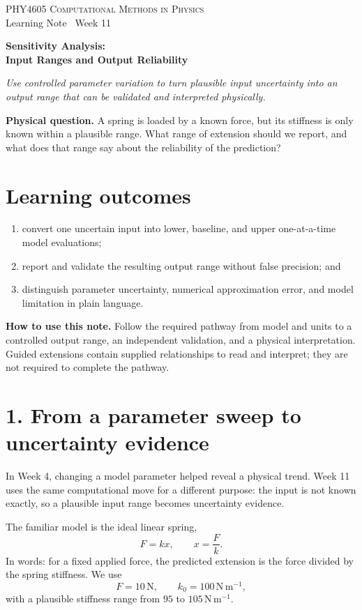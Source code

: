 \documentclass[11pt,a4paper]{article}
\newcommand{\course}{PHY4605 Computational Methods in Physics}
\newcommand{\units}[1]{\,\mathrm{#1}}
\begin{document}
{\large\textsc{\course}}\\[-2pt]
{\small Learning Note \textbar\ Week 11}\par\vspace{4pt}
{\LARGE\bfseries Sensitivity Analysis:\\[-1pt]
Input Ranges and Output Reliability}\par\vspace{3pt}
\textit{Use controlled parameter variation to turn plausible input uncertainty into an output range that can be validated and interpreted physically.}

\begin{keybox}\textbf{Physical question.} A spring is loaded by a known force, but its stiffness is only known within a plausible range. What range of extension should we report, and what does that range say about the reliability of the prediction?\end{keybox}

\section*{Learning outcomes}
\begin{enumerate}[nosep,leftmargin=5mm]
\item convert one uncertain input into lower, baseline, and upper one-at-a-time model evaluations;
\item report and validate the resulting output range without false precision; and
\item distinguish parameter uncertainty, numerical approximation error, and model limitation in plain language.
\end{enumerate}

\textbf{How to use this note.} Follow the required pathway from model and units to a controlled output range, an independent validation, and a physical interpretation. Guided extensions contain supplied relationships to read and interpret; they are not required to complete the pathway.

\section*{1. From a parameter sweep to uncertainty evidence}
In Week 4, changing a model parameter helped reveal a physical trend. Week 11 uses the same computational move for a different purpose: the input is not known exactly, so a plausible input range becomes uncertainty evidence.

The familiar model is the ideal linear spring,
\[
F=kx, \qquad x=\frac{F}{k}.
\]
In words: for a fixed applied force, the predicted extension is the force divided by the spring stiffness. We use
\[
F=10\units{N}, \qquad k_0=100\units{N\,m^{-1}},
\]
with a plausible stiffness range from $95$ to $105\units{N\,m^{-1}}$.
\end{document}
